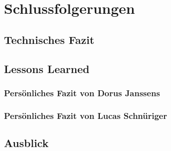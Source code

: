 \section{Schlussfolgerungen}

\subsection{Technisches Fazit}


\subsection{Lessons Learned}

\subsubsection{Persönliches Fazit von Dorus Janssens}

\subsubsection{Persönliches Fazit von Lucas Schnüriger}


\subsection{Ausblick}

